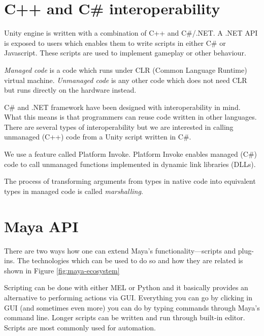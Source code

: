 \documentclass[
  digital, %
  table,   %
  nolof,     %
  nolot,     %
  oneside,
]{fithesis3}
\begin{document}
\section{C++ and C\# interoperability}
Unity engine is written with a combination of C++ and C\#/.NET. A .NET API is exposed to users which enables them to write scripts in either C\# or Javascript. These scripts are used to implement gameplay or other behaviour.

\textit{Managed code} is a code which runs under CLR (Common Language Runtime) virtual machine. \textit{Unmanaged code} is any other code which does not need CLR but runs directly on the hardware instead.

C\# and .NET framework have been designed with interoperability in mind. What this means is that programmers can reuse code written in other languages. There are several types of interoperability but we are interested in calling unmanaged (C++) code from a Unity script written in C\#.

We use a feature called Platform Invoke. Platform Invoke enables managed (C\#) code to call unmanaged functions implemented in dynamic link libraries (DLLs).

The process of transforming arguments from types in native code into equivalent types in managed code is called \textit{marshalling}.


\section{Maya API}

There are two ways how one can extend Maya's functionality—scripts and plug-ins. The technologies which can be used to do so and how they are related is shown in Figure \ref{fig:maya-ecosystem}

Scripting can be done with either MEL or Python and it basically provides an alternative to performing actions via GUI. Everything you can go by clicking in GUI (and sometimes even more) you can do by typing commands through Maya's command line. Longer scripts can be written and run through built-in editor. Scripts are most commonly used for automation.
\end{document}
